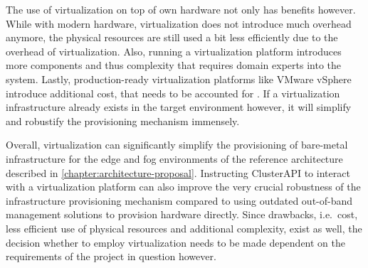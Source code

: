     The use of virtualization on top of own hardware not only has benefits however. While with modern hardware, virtualization does not introduce much overhead anymore, the physical resources are still used a bit less efficiently due to the overhead of virtualization. Also, running a virtualization platform introduces more components and thus complexity that requires domain experts into the system. Lastly, production-ready virtualization platforms like VMware vSphere introduce additional cost, that needs to be accounted for \cite{baremetal_vs_hypervisor}. If a virtualization infrastructure already exists in the target environment however, it will simplify and robustify the provisioning mechanism immensely. \newline

    Overall, virtualization can significantly simplify the provisioning of bare-metal infrastructure for the edge and fog environments of the reference architecture described in \autoref{chapter:architecture-proposal}. Instructing ClusterAPI to interact with a virtualization platform can also improve the very crucial robustness of the infrastructure provisioning mechanism compared to using outdated out-of-band management solutions to provision hardware directly. Since drawbacks, i.e.\ cost, less efficient use of physical resources and additional complexity, exist as well, the decision whether to employ virtualization needs to be made dependent on the requirements of the project in question however.